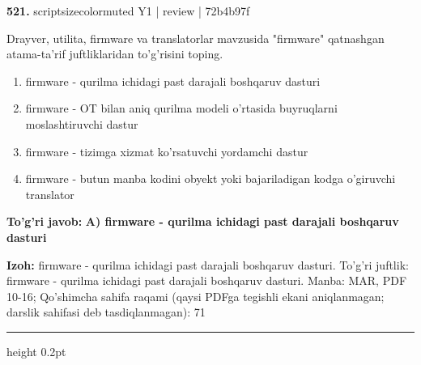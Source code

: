 \documentclass[10pt,a4paper]{article}
\begin{document}
{\bfseries\sffamily\color{ink} 521.} {scriptsizecolor{muted} Y1 | review | 72b4b97f}
\par
Drayver, utilita, firmware va translatorlar mavzusida "firmware" qatnashgan atama-ta'rif juftliklaridan to'g'risini toping.
\begin{enumerate}[label=\Alph*),leftmargin=9mm]
\item firmware - qurilma ichidagi past darajali boshqaruv dasturi
\item firmware - OT bilan aniq qurilma modeli o'rtasida buyruqlarni moslashtiruvchi dastur
\item firmware - tizimga xizmat ko'rsatuvchi yordamchi dastur
\item firmware - butun manba kodini obyekt yoki bajariladigan kodga o'giruvchi translator
\end{enumerate}
\begin{tcolorbox}[enhanced,breakable,colback=teal!4,colframe=teal!60!black,boxrule=0.45pt,arc=1.2mm,left=2.7mm,right=2.7mm,top=1.8mm,bottom=1.8mm,before skip=2mm,after skip=2mm]
{\bfseries\sffamily\color{teal}To'g'ri javob:} \textbf{A) firmware - qurilma ichidagi past darajali boshqaruv dasturi}
\par\smallskip
{\bfseries Izoh:} firmware - qurilma ichidagi past darajali boshqaruv dasturi. To'g'ri juftlik: firmware - qurilma ichidagi past darajali boshqaruv dasturi. Manba: MAR, PDF 10-16; Qo'shimcha sahifa raqami (qaysi PDFga tegishli ekani aniqlanmagan; darslik sahifasi deb tasdiqlanmagan): 71
\end{tcolorbox}
\vspace{2mm}\hrule height 0.2pt\vspace{3mm}
\end{document}
